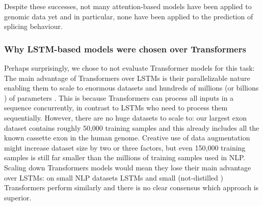 
Despite these successes, not many attention-based models have been applied to genomic data yet and in particular, none have been applied to the prediction of splicing behaviour. 

\subsubsection{Why LSTM-based models were chosen over Transformers} \label{lstmvstransformer}
Perhaps surprisingly, we chose to not evaluate Transformer models for this task:
The main advantage of Transformers over LSTMs is their parallelizable nature enabling them to scale to enormous datasets and hundreds of millions (or billions \cite{gpt3}) of parameters \cite{allyouneed}. This is because Transformers can process all inputs in a sequence concurrently, in contrast to LSTMs who need to process them sequentially. However, there are no huge datasets to scale to: our largest exon dataset contains roughly 50,000 training samples and this already includes all the known cassette exon in the human genome. Creative use of data augmentation might increase dataset size by two or three factors, but even 150,000 training samples is still far smaller than the millions of training samples used in NLP. Scaling down Transformers models would mean they lose their main advantage over LSTMs: on small NLP datasets LSTMs and small (not-distilled \cite{distilbert}) Transformers perform similarly \cite{mogrifier}\cite{smalltransformerwin} and there is no clear consensus which approach is superior. 

